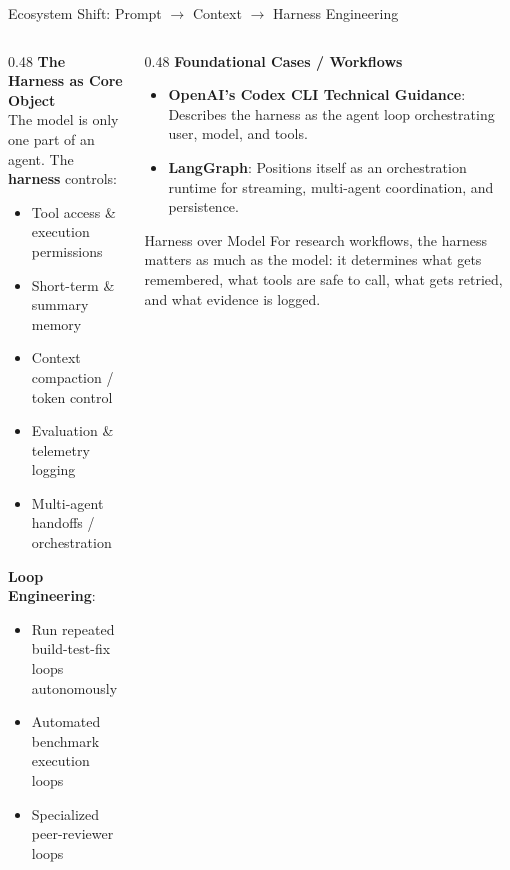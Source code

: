 \begin{frame}{Ecosystem Shift: Prompt $\to$ Context $\to$ Harness Engineering}
  \begin{columns}[T, onlytextwidth]
    \begin{column}{0.48\textwidth}
      \textbf{The Harness as Core Object}\\
      The model is only one part of an agent. The \textbf{harness} controls:
      \begin{itemize}
        \item Tool access \& execution permissions
        \item Short-term \& summary memory
        \item Context compaction / token control
        \item Evaluation \& telemetry logging
        \item Multi-agent handoffs / orchestration
      \end{itemize}
      \vspace{0.3em}
      \textbf{Loop Engineering}:
      \begin{itemize}
        \item Run repeated build-test-fix loops autonomously
        \item Automated benchmark execution loops
        \item Specialized peer-reviewer loops
      \end{itemize}
    \end{column}
    \hfill
    \begin{column}{0.48\textwidth}
      \textbf{Foundational Cases / Workflows}
      \begin{itemize}
        \item \textbf{OpenAI's Codex CLI Technical Guidance}: Describes the harness as the agent loop orchestrating user, model, and tools.
        \item \textbf{LangGraph}: Positions itself as an orchestration runtime for streaming, multi-agent coordination, and persistence.
      \end{itemize}
      \vspace{0.4em}
      \begin{block}{Harness over Model}
        \small For research workflows, the harness matters as much as the model: it determines what gets remembered, what tools are safe to call, what gets retried, and what evidence is logged.
      \end{block}
    \end{column}
  \end{columns}
\end{frame}

